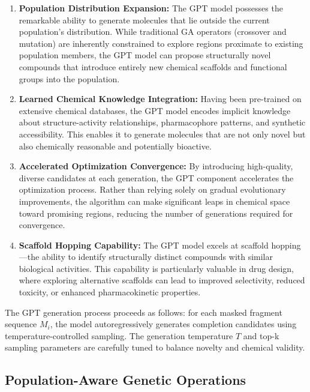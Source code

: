 \documentclass[lettersize,journal]{IEEEtran}
\begin{document}
\begin{enumerate}
\item \textbf{Population Distribution Expansion:} The GPT model possesses the remarkable ability to generate molecules that lie outside the current population's distribution. While traditional GA operators (crossover and mutation) are inherently constrained to explore regions proximate to existing population members, the GPT model can propose structurally novel compounds that introduce entirely new chemical scaffolds and functional groups into the population.

\item \textbf{Learned Chemical Knowledge Integration:} Having been pre-trained on extensive chemical databases, the GPT model encodes implicit knowledge about structure-activity relationships, pharmacophore patterns, and synthetic accessibility. This enables it to generate molecules that are not only novel but also chemically reasonable and potentially bioactive.

\item \textbf{Accelerated Optimization Convergence:} By introducing high-quality, diverse candidates at each generation, the GPT component accelerates the optimization process. Rather than relying solely on gradual evolutionary improvements, the algorithm can make significant leaps in chemical space toward promising regions, reducing the number of generations required for convergence.

\item \textbf{Scaffold Hopping Capability:} The GPT model excels at scaffold hopping—the ability to identify structurally distinct compounds with similar biological activities. This capability is particularly valuable in drug design, where exploring alternative scaffolds can lead to improved selectivity, reduced toxicity, or enhanced pharmacokinetic properties.
\end{enumerate}

The GPT generation process proceeds as follows: for each masked fragment sequence $M_i$, the model autoregressively generates completion candidates using temperature-controlled sampling. The generation temperature $T$ and top-k sampling parameters are carefully tuned to balance novelty and chemical validity.

\subsection{Population-Aware Genetic Operations}
\end{document}
